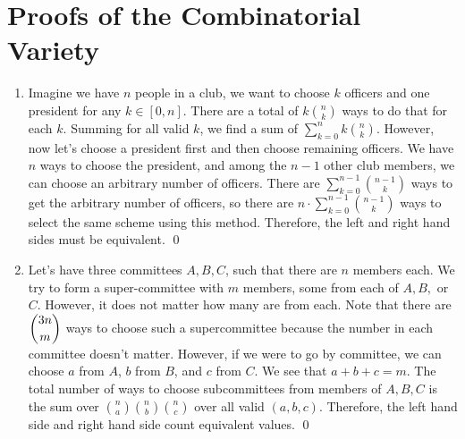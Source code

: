 \documentclass{article}
\begin{document}
	\section{Proofs of the Combinatorial Variety}
	\begin{enumerate}[label=\alph*)]
		\item Imagine we have $n$ people in a club, we want to choose $k$ officers and
			one president for any $k \in [0, n]$. There are a total of $k \binom{n}{k}$ 
			ways to do that for each $k$. Summing for all valid $k$, we find a sum of 
			$\sum_{k=0}^n k \binom{n}{k}$. However, now let's choose a president first
			and then choose remaining officers. We have $n$ ways to choose the president,
			and among the $n-1$ other club members, we can choose an arbitrary number of 
			officers. There are $\sum_{k=0}^{n-1} \binom{n-1}{k}$ ways to get the 
			arbitrary number of officers, so there are $n \cdot \sum_{k=0}^{n-1} \binom{n-1}{k}$
			ways to select the same scheme using this method. Therefore, the left and right
			hand sides must be equivalent. \qed
		\item Let's have three committees $A, B, C$, such that there are $n$ members each.
			We try to form a super-committee with $m$ members, some from each of $A, B,$ or $C$.
			However, it does not matter how many are from each. Note that there are $\dbinom{3n}{m}$
			ways to choose such a supercommittee because the number in each committee doesn't 
			matter. However, if we were to go by committee, we can choose $a$ from $A$, $b$
			from $B$, and $c$ from $C$. We see that $a + b + c = m$. The total number of
			ways to choose subcommittees from members of $A, B, C$ is the sum over 
			$\binom{n}{a} \binom{n}{b} \binom{n}{c}$ over all valid $(a, b, c)$. Therefore, the
			left hand side and right hand side count equivalent values. \qed
	\end{enumerate}
\end{document}
